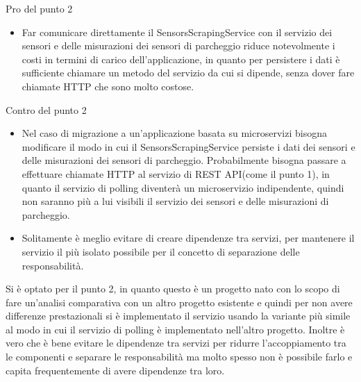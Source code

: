 \leavevmode\newline
Pro del punto 2
\begin{itemize}
    \item Far comunicare direttamente il SensorsScrapingService con il servizio dei sensori e delle misurazioni dei sensori di parcheggio
        riduce notevolmente i costi in termini di carico dell'applicazione, in quanto per persistere i dati è sufficiente chiamare un
        metodo del servizio da cui si dipende, senza dover fare chiamate HTTP che sono molto costose. 
\end{itemize}
\leavevmode\newline
Contro del punto 2
\begin{itemize}
    \item Nel caso di migrazione a un'applicazione basata su microservizi bisogna modificare il modo in cui il SensorsScrapingService 
        persiste i dati dei sensori
        e delle misurazioni dei sensori di parcheggio. Probabilmente bisogna passare a effettuare chiamate HTTP al servizio di REST API(come il punto 1),
        in quanto il servizio di polling diventerà un microservizio indipendente, quindi non saranno più a lui visibili il servizio dei 
        sensori e delle misurazioni di parcheggio.
    \item Solitamente è meglio evitare di creare dipendenze tra servizi, per mantenere il servizio il più isolato possibile per il
        concetto di separazione delle responsabilità.
\end{itemize}
\leavevmode\newline
Si è optato per il punto 2, in quanto questo è un progetto nato con lo scopo di fare un'analisi comparativa con un altro progetto esistente
e quindi per non avere differenze prestazionali si è implementato il servizio usando la variante più simile al modo in cui il 
servizio di polling è implementato nell'altro progetto. Inoltre è vero che è bene evitare le dipendenze tra servizi per ridurre
l'accoppiamento tra le componenti e separare le responsabilità ma molto spesso non è possibile farlo e capita frequentemente
di avere dipendenze tra loro.

